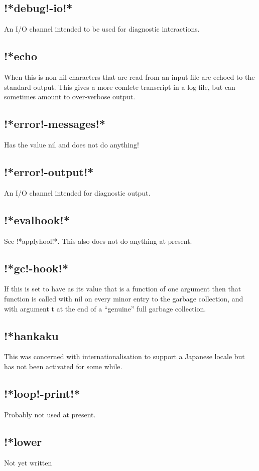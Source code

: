 \documentclass[a4paper,11pt]{article}
\begin{document}
\subsection{\ttfamily !*debug!-io!*}
An I/O channel intended to be used for diagnostic interactions.
\subsection{\ttfamily !*echo}
When this is non-nil characters that are read from an input file are
echoed to the standard output. This gives a more comlete transcript in
a log file, but can sometimes amount to over-verbose output.
\subsection{\ttfamily !*error!-messages!*}
Has the value nil and does not do anything!
\subsection{\ttfamily !*error!-output!*}
An I/O channel intended for diagnostic output.
\subsection{\ttfamily !*evalhook!*}
See {\ttfamily !*applyhool!*}. This also does not do anything at present.
\subsection{\ttfamily !*gc!-hook!*}
If this is set to have as its value that is a function of one argument then
that function is called with {\ttfamily nil} on every minor entry to the
garbage collection, and with argument {\ttfamily t} at the end of a ``genuine''
full garbage collection.
\subsection{\ttfamily !*hankaku}
This was concerned with internationalisation to support a Japanese
locale but has not been activated for some while.
\subsection{\ttfamily !*loop!-print!*}
Probably not used at present.
\subsection{\ttfamily !*lower}
Not yet written
\end{document}
